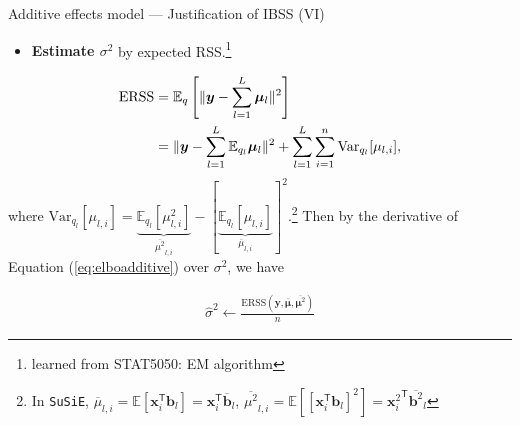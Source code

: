 \documentclass[10pt]{beamer}
\begin{document}
\begin{frame}{Additive effects model --- \normalsize Justification of IBSS (VI)}
    \begin{itemize}
        \item \textbf{Estimate $\sigma^2$} by expected RSS.\footnote{learned from STAT5050: EM algorithm}
    \end{itemize}
    \begin{align}
        \text{ERSS} 
        & = \mathbb{E}_{q}\left[\|\bm{y} - \sum_{l=1}^L\bm{\mu}_l\|^2\right] \notag\\
        & = \|\bm{y}-\sum_{l=1}^L\mathbb{E}_{q_l}{\bm{\mu}}_l\|^2 + \sum_{l=1}^L\sum_{i=1}^n\text{Var}_{q_l}[\mu_{l,i}],
    \end{align}
    where $\text{Var}_{q_l}[\mu_{l,i}]=\underbrace{\mathbb{E}_{q_l}[\mu_{l,i}^2]}_{\overline{\mu^2}_{l,i}} - [\underbrace{\mathbb{E}_{q_l}[\mu_{l,i}]}_{\overline{\mu}_{l,i}}]^2$.\footnote{
    In \texttt{SuSiE}, 
    $\overline{\mu}_{l,i} = \mathbb{E}[\bm{x}_{i}^\mathsf{T}\bm{b}_{l}] = \bm{x}_{i}^\mathsf{T}\overline{\bm{b}}_{l}$,
    $\overline{\mu^2}_{l,i} = \mathbb{E}[[\bm{x}_{i}^\mathsf{T}\bm{b}_{l}]^2] = {\bm{x}^{2}_{i}}^\mathsf{T}\overline{\bm{b}^2}_{l}$}
    Then by the derivative of Equation (\ref{eq:elboadditive}) over $\sigma^2$, we have
    
    \begin{gather}
        \hat{\sigma}^2 \gets \frac{\text{ERSS}(\bm{y},\overline{\bm{\mu}},\overline{\bm{\mu}^2})}{n}
    \end{gather}

\end{frame}
\end{document}
